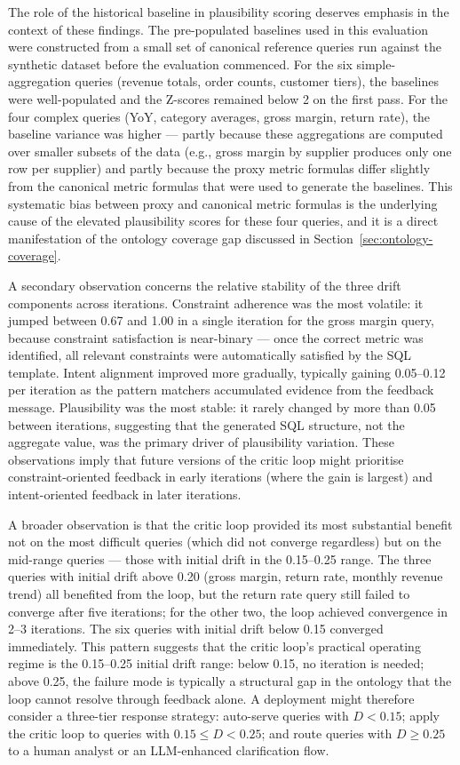 \documentclass[12pt,a4paper]{report}
\begin{document}
The role of the historical baseline in plausibility scoring deserves emphasis in the context of these findings. The pre-populated baselines used in this evaluation were constructed from a small set of canonical reference queries run against the synthetic dataset before the evaluation commenced. For the six simple-aggregation queries (revenue totals, order counts, customer tiers), the baselines were well-populated and the Z-scores remained below 2 on the first pass. For the four complex queries (YoY, category averages, gross margin, return rate), the baseline variance was higher — partly because these aggregations are computed over smaller subsets of the data (e.g., gross margin by supplier produces only one row per supplier) and partly because the proxy metric formulas differ slightly from the canonical metric formulas that were used to generate the baselines. This systematic bias between proxy and canonical metric formulas is the underlying cause of the elevated plausibility scores for these four queries, and it is a direct manifestation of the ontology coverage gap discussed in Section~\ref{sec:ontology-coverage}.

A secondary observation concerns the relative stability of the three drift components across iterations. Constraint adherence was the most volatile: it jumped between 0.67 and 1.00 in a single iteration for the gross margin query, because constraint satisfaction is near-binary — once the correct metric was identified, all relevant constraints were automatically satisfied by the SQL template. Intent alignment improved more gradually, typically gaining 0.05--0.12 per iteration as the pattern matchers accumulated evidence from the feedback message. Plausibility was the most stable: it rarely changed by more than 0.05 between iterations, suggesting that the generated SQL structure, not the aggregate value, was the primary driver of plausibility variation. These observations imply that future versions of the critic loop might prioritise constraint-oriented feedback in early iterations (where the gain is largest) and intent-oriented feedback in later iterations.

A broader observation is that the critic loop provided its most substantial benefit not on the most difficult queries (which did not converge regardless) but on the mid-range queries — those with initial drift in the 0.15--0.25 range. The three queries with initial drift above 0.20 (gross margin, return rate, monthly revenue trend) all benefited from the loop, but the return rate query still failed to converge after five iterations; for the other two, the loop achieved convergence in 2--3 iterations. The six queries with initial drift below 0.15 converged immediately. This pattern suggests that the critic loop's practical operating regime is the 0.15--0.25 initial drift range: below 0.15, no iteration is needed; above 0.25, the failure mode is typically a structural gap in the ontology that the loop cannot resolve through feedback alone. A deployment might therefore consider a three-tier response strategy: auto-serve queries with $D < 0.15$; apply the critic loop to queries with $0.15 \leq D < 0.25$; and route queries with $D \geq 0.25$ to a human analyst or an LLM-enhanced clarification flow.
\end{document}
